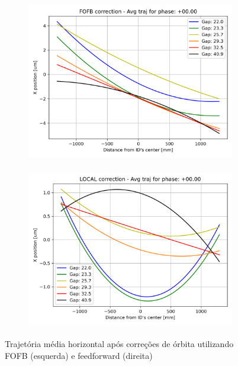\documentclass[a4paper,12pt]{article}
\begin{document}
\begin{figure}[H]
\begin{subfigure}{0.5\textwidth}
\includegraphics[width=0.9\linewidth, height=7cm]{figs/phase0 horizontal-avg-traj-FOFB.png} 
\label{fig:subim10xc}
\end{subfigure}
\begin{subfigure}{0.5\textwidth}
\includegraphics[width=0.9\linewidth, height=7cm]{figs/phase0 horizontal-avg-traj-LOCAL.png}
\label{fig:subim20xc}
\end{subfigure}
\caption{Trajetória média horizontal após correções de órbita utilizando FOFB (esquerda) e feedforward (direita)}
\label{fig:corrx}
\end{figure}
\end{document}
